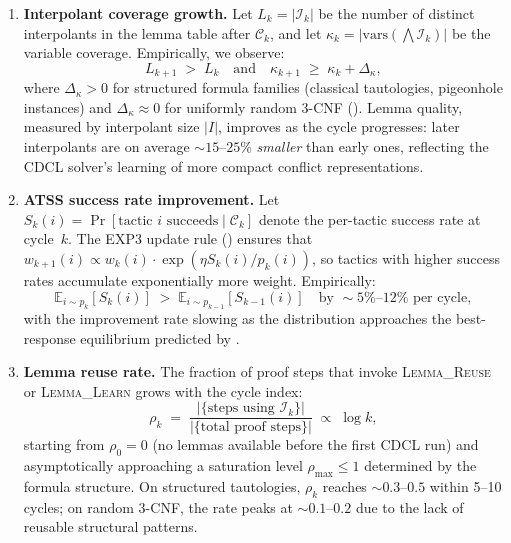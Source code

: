 \documentclass[acmtocl,review,anonymous]{acmart}
\begin{document}
\begin{enumerate}
  \item \textbf{Interpolant coverage growth.}
    Let $L_k = |\mathcal{I}_k|$ be the number of distinct interpolants
    in the lemma table after $\mathcal{C}_k$, and let
    $\kappa_k = |\mathrm{vars}(\bigwedge \mathcal{I}_k)|$ be the
    variable coverage.  Empirically, we observe:
    \begin{equation}
      L_{k+1} \;>\; L_k \quad\text{and}\quad
      \kappa_{k+1} \;\ge\; \kappa_k + \Delta_\kappa,
      \label{eq:interp-growth}
    \end{equation}
    where $\Delta_\kappa > 0$ for structured formula families
    (classical tautologies, pigeonhole instances) and
    $\Delta_\kappa \approx 0$ for uniformly random 3-CNF
    ().  Lemma quality, measured by
    interpolant size $|I|$, improves as the cycle progresses:
    later interpolants are on average ${\sim}15$--$25\%$
    \emph{smaller} than early ones, reflecting the CDCL solver's
    learning of more compact conflict representations.

  \item \textbf{ATSS success rate improvement.}
    Let $S_k(i) = \Pr[\text{tactic } i \text{ succeeds} \mid \mathcal{C}_k]$
    denote the per-tactic success rate at cycle~$k$.  The EXP3
    update rule () ensures that
    $w_{k+1}(i) \propto w_k(i) \cdot \exp(\eta S_k(i) / p_k(i))$,
    so tactics with higher success rates accumulate exponentially
    more weight.  Empirically:
    \begin{equation}
      \mathbb{E}_{i \sim p_k}[S_k(i)] \;>\;
      \mathbb{E}_{i \sim p_{k-1}}[S_{k-1}(i)]
      \quad\text{by } {\sim}5\%\text{--}12\%\text{ per cycle},
      \label{eq:atss-improvement}
    \end{equation}
    with the improvement rate slowing as the distribution approaches
    the best-response equilibrium predicted by
    .

  \item \textbf{Lemma reuse rate.}
    The fraction of proof steps that invoke
    \textsc{Lemma\_Reuse} or \textsc{Lemma\_Learn} grows with the
    cycle index:
    \begin{equation}
      \rho_k \;=\; \frac{|\{\text{steps using }\mathcal{I}_k\}|}
                        {|\{\text{total proof steps}\}|}
      \;\propto\; \log k,
      \label{eq:reuse-rate}
    \end{equation}
    starting from $\rho_0 = 0$ (no lemmas available before the first
    CDCL run) and asymptotically approaching a saturation level
    $\rho_{\max} \le 1$ determined by the formula structure.  On
    structured tautologies, $\rho_k$ reaches ${\sim}0.3$--$0.5$
    within 5--10 cycles; on random 3-CNF, the rate peaks at
    ${\sim}0.1$--$0.2$ due to the lack of reusable structural
    patterns.


\end{enumerate}
\end{document}
